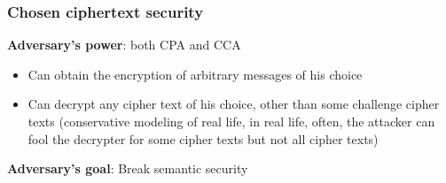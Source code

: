 \documentclass[12pt]{book}
\begin{document}
\subsubsection{Chosen ciphertext security}
\textbf{Adversary's power}: both CPA and CCA
\begin{itemize}
	\item Can obtain the encryption of arbitrary messages of his choice
	\item Can decrypt any cipher text of his choice, other than some challenge cipher texts (conservative modeling of real life, in real life, often, the attacker can fool the decrypter for some cipher texts but not all cipher texts)
\end{itemize}

\textbf{Adversary's goal}: Break semantic security
\end{document}
